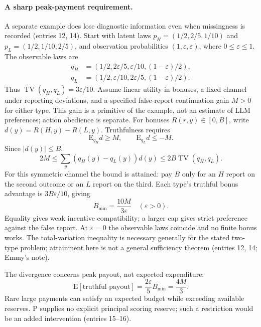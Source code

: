 \documentclass{article}
\begin{document}
\paragraph{A sharp peak-payment requirement.}
A separate example does lose diagnostic information even when missingness is recorded (entries 12,
14).
Start with latent laws \(p_H=(1/2,2/5,1/10)\) and
\(p_L=(1/2,1/10,2/5)\), and observation probabilities
\((1,\varepsilon,\varepsilon)\), where \(0\leq\varepsilon\leq1\).
The observable laws are
\begin{align*}
 q_H&=(1/2,2\varepsilon/5,\varepsilon/10,(1-\varepsilon)/2),\\
 q_L&=(1/2,\varepsilon/10,2\varepsilon/5,(1-\varepsilon)/2).
\end{align*}
Thus \(\operatorname{TV}(q_H,q_L)=3\varepsilon/10\).
Assume linear utility in bonuses, a fixed channel under reporting deviations, and a specified
false-report continuation gain \(M>0\) for either type.
This gain is a primitive of the example, not an estimate of LLM preferences; action obedience is
separate.
For bonuses \(R(r,y)\in[0,B]\), write \(d(y)=R(H,y)-R(L,y)\).
Truthfulness requires
\[
 \mathrm{E}_{q_H}d\geq M,\qquad \mathrm{E}_{q_L}d\leq-M.
\]
Since \(\lvert d(y)\rvert\leq B\),
\[
 2M\leq\sum_y(q_H(y)-q_L(y))d(y)
 \leq2B\operatorname{TV}(q_H,q_L).
\]
For this symmetric channel the bound is attained: pay \(B\) only for an
\(H\) report on the second outcome or an \(L\) report on the third.
Each type's truthful bonus advantage is \(3B\varepsilon/10\), giving
\[
 B_{\min}=\frac{10M}{3\varepsilon}\quad(\varepsilon>0).
\]
Equality gives weak incentive compatibility; a larger cap gives strict preference against the false
report.
At \(\varepsilon=0\) the observable laws coincide and no finite bonus works.
The total-variation inequality is necessary generally for the stated two-type problem; attainment
here is not a general sufficiency theorem (entries 12, 14; Emmy's note).

The divergence concerns peak payout, not expected expenditure:
\[
 \mathrm{E}[\text{truthful payout}]
 =\frac{2\varepsilon}{5}B_{\min}=\frac{4M}{3}.
\]
Rare large payments can satisfy an expected budget while exceeding available reserves.
P supplies no explicit principal scoring reserve; such a restriction would be an added intervention
(entries 15--16).
\end{document}
